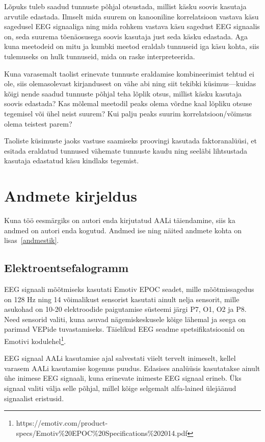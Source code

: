 \documentclass[a4paper,12pt]{report}
\begin{document}
Lõpuks tuleb saadud tunnuste põhjal otsustada, millist käsku soovis kasutaja arvutile edastada. Ilmselt mida suurem on kanooniline korrelatsioon vastava käsu sagedusel EEG signaaliga ning mida rohkem vastava käsu sagedust EEG signaalis on, seda suurema tõenäosusega soovis kasutaja just seda käsku edastada. Aga kuna meetodeid on mitu ja kumbki meetod eraldab tunnuseid iga käsu kohta, siis tulemuseks on hulk tunnuseid, mida on raske interpreteerida.

Kuna varasemalt taolist erinevate tunnuste eraldamise kombineerimist tehtud ei ole, siis olemasolevast kirjandusest on vähe abi ning siit tekibki küsimus---kuidas kõigi nende saadud tunnuste põhjal teha lõplik otsus, millist käsku kasutaja soovis edastada? Kas mõlemal meetodil peaks olema võrdne kaal lõpliku otsuse tegemisel või ühel neist suurem? Kui palju peaks suurim korrelatsioon/võimsus olema teistest parem?

Taoliste küsimuste jaoks vastuse saamiseks proovingi kasutada faktoranalüüsi, et esitada eraldatud tunnused vähemate tunnuste kaudu ning seeläbi lihtsustada kasutaja edastatud käsu kindlaks tegemist.

\chapter{Andmete kirjeldus}

Kuna töö eesmärgiks on autori enda kirjutatud AALi täiendamine, siis ka andmed on autori enda kogutud. Andmed ise ning näited andmete kohta on lisas~\ref{andmestik}.

\section{Elektroentsefalogramm}

EEG signaali mõõtmiseks kasutati Emotiv EPOC seadet, mille mõõtmissagedus on 128 Hz ning 14 võimalikust sensorist kasutati ainult nelja sensorit, mille asukohad on 10-20 elektroodide paigutamise süsteemi järgi P7, O1, O2 ja P8. Need sensorid valiti, kuna asuvad nägemiskeskusele kõige lähemal ja seega on parimad VEPide tuvastamiseks. Täielikud EEG seadme spetsifikatsioonid on Emotivi kodulehel\footnote{https://emotiv.com/product-specs/Emotiv\%20EPOC\%20Specifications\%202014.pdf}.

EEG signaal AALi kasutamise ajal salvestati viielt tervelt inimeselt, kellel varasem AALi kasutamise kogemus puudus. Edasises analüüsis kasutatakse ainult ühe inimese EEG signaali, kuna erinevate inimeste EEG signaal erineb. Üks signaal valiti välja selle põhjal, millel kõige selgemalt alfa-lained ülejäänud signaalist eristusid.
\end{document}

